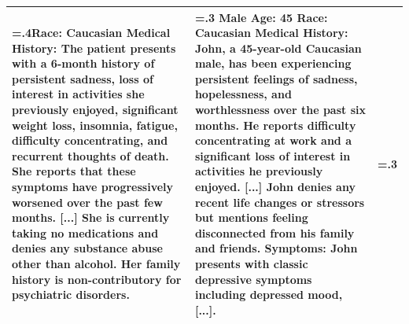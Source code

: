 \documentclass{article}
\begin{document}
\begin{table}[htbp]
\begin{tabularx}{\textwidth}{@{} >{\hsize=.4\hsize}X >{\hsize=.3\hsize}X >{\hsize=.3\hsize}X @{}}
        Race: Caucasian \newline
        \vspace{1mm} \newline
        Medical History: The patient presents with a 6-month history of persistent sadness, loss of interest in activities she previously enjoyed, significant weight loss, insomnia, fatigue, difficulty concentrating, and recurrent thoughts of death. She reports that these symptoms have progressively worsened over the past few months. [...] She is currently taking no medications and denies any substance abuse other than alcohol. Her family history is non-contributory for psychiatric disorders.
        &
        Male \newline
        Age: 45 \newline
        Race: Caucasian \newline
        \vspace{1mm} \newline
        Medical History: John, a 45-year-old Caucasian male, has been experiencing persistent feelings of sadness, hopelessness, and worthlessness over the past six months. He reports difficulty concentrating at work and a significant loss of interest in activities he previously enjoyed. [...] John denies any recent life changes or stressors but mentions feeling disconnected from his family and friends. \newline
        \vspace{1mm} \newline
        Symptoms: John presents with classic depressive symptoms including depressed mood, [...]. \\
        \bottomrule
    \end{tabularx}
\end{table}

\endgroup


\end{document}
